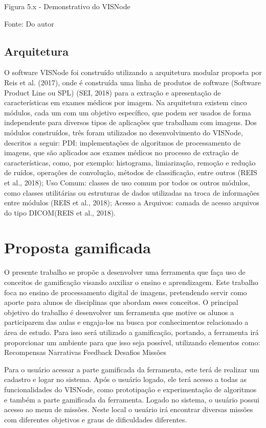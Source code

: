 \documentclass[
	12pt,				%
	oneside,			%
	a4paper,			%
	english,			%
	french,				%
	spanish,			%
	brazil,				%
	]{abntex2}
\begin{document}
Figura 5.x - Demonstrativo do VISNode

Fonte: Do autor

\subsection{Arquitetura}

O software VISNode foi construído utilizando a arquitetura modular proposta por Reis et al. (2017), onde é construída uma linha de produtos de software (Software Product Line ou SPL) (SEI, 2018)  para a extração e apresentação de características em exames médicos por imagem. Na arquitetura existem cinco módulos, cada um com um objetivo específico, que podem ser usados de forma independente para diversos tipos de aplicações que trabalham com imagens. Dos módulos construídos, três foram utilizados no desenvolvimento do VISNode, descritos a seguir:
	PDI: implementações de algoritmos de processamento de imagens, que são aplicados aos exames médicos no processo de extração de características, como, por exemplo: histograma, limiarização, remoção e redução de ruídos, operações de convolução, métodos de classificação, entre outros (REIS et al., 2018); 
Uso Comum: classes de uso  comum  por todos os outros módulos, como classes utilitárias ou estruturas de dados utilizadas na troca de informações entre módulos (REIS et al., 2018); 
Acesso a Arquivos: camada de acesso arquivos do tipo DICOM(REIS et al., 2018).


\section{Proposta gamificada}


	O presente trabalho se propõe a desenvolver uma ferramenta que faça uso de conceitos de gamificação visando auxiliar o ensino e aprendizagem. Este trabalho foca no ensino de processamento digital de imagens, pretendendo servir como aporte para alunos de disciplinas que abordam esses conceitos.
	O principal objetivo do trabalho é desenvolver um ferramenta que motive os alunos a participarem das aulas e engaja-los na busca por conhecimentos relacionado a área de estudo. Para isso será utilizado a gamificação, portando, a ferramenta irá proporcionar um ambiente para que isso seja possível, utilizando elementos como:
Recompensas
Narrativas
Feedback
Desafios
Missões

	Para o usuário acessar a parte gamificada da ferramenta, este terá de realizar um cadastro e logar no sistema. Após o usuário logado, ele terá acesso a todas as funcionalidades do VISNode, como prototipação e experimentação de algoritmos e também a parte gamificada da ferramenta.
	Logado no sistema, o usuário possui acesso ao menu de missões. Neste local o usuário irá encontrar diversas missões com diferentes objetivos e graus de dificuldades diferentes.	
\end{document}
